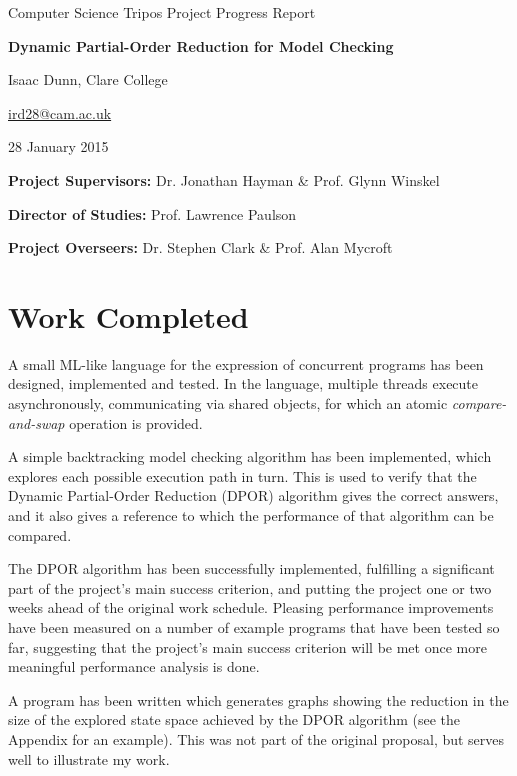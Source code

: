 \documentclass[12pt,a4paper,twoside]{article}
\begin{document}
\centerline{\Large Computer Science Tripos Project Progress Report}
\vspace{0.35in}
\centerline{\LARGE\bf Dynamic Partial-Order Reduction for Model Checking}
\vspace{0.3in}
\centerline{\large Isaac Dunn, Clare College}
\vspace{0.1in}
\centerline{\href{mailto:ird28@cam.ac.uk}{ird28@cam.ac.uk}}
\vspace{0.2in}
\centerline{\large 28 January 2015}

\vfil


\noindent
{\bf Project Supervisors:} Dr. Jonathan Hayman \& Prof. Glynn Winskel
\vspace{0.2in}

\noindent
{\bf Director of Studies:} Prof. Lawrence Paulson
\vspace{0.2in}
\noindent
 
\noindent
{\bf Project Overseers:} Dr. Stephen Clark  \& Prof. Alan Mycroft



\section*{Work Completed}

A small ML-like language for the expression of
concurrent programs has been designed, implemented and tested.
In the language, multiple threads execute asynchronously,
communicating via shared objects, for which an atomic \emph{compare-and-swap} operation is provided.

A simple backtracking model checking algorithm has been implemented, which
explores each possible execution path in turn. This is used to verify that
the Dynamic Partial-Order Reduction (DPOR) algorithm gives the correct answers,
and it also gives a reference to which the performance of that algorithm can be
compared.

The DPOR algorithm \cite{popl05} has been successfully implemented, fulfilling
a significant part of the project's main success criterion, and putting the
project one or two weeks ahead of the original work schedule. Pleasing performance
improvements have been measured on a number of example programs that have
been tested so far, suggesting that the project's main success criterion will be
met once more meaningful performance analysis is done.

A program has been written which generates graphs showing the reduction in the
size of the explored state space achieved by the DPOR algorithm (see
the Appendix for an example).
This was not part of the original proposal, but serves well to illustrate
my work.
\end{document}
